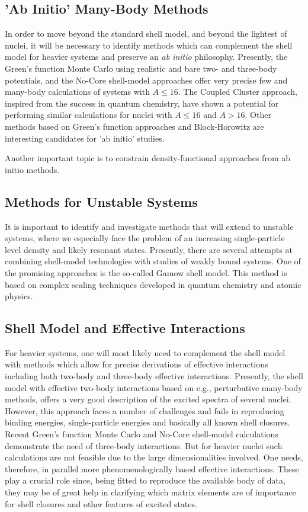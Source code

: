 \subsection{'Ab Initio' Many-Body Methods}

In order to move beyond the standard shell model, and beyond the
lightest of nuclei, it will be necessary to
identify methods which can complement the shell model for heavier 
systems and preserve an {\it ab initio} philosophy. Presently, 
the Green's function Monte Carlo using realistic
and bare two- and three-body potentials, 
and the No-Core shell-model 
approaches offer very precise few and many-body 
calculations of systems with 
$A\le 16$.  The Coupled Cluster approach, inspired 
from the success in quantum chemistry, have shown a 
potential for performing similar calculations
for nuclei with $A\le 16$ and $A> 16$. 
Other methods based on Green's function approaches and 
Block-Horowitz are interesting candidates for 'ab initio' studies.

Another important topic is to constrain density-functional approaches from ab initio
methods.


\subsection{Methods for Unstable Systems} 

It is important to identify and investigate 
methods that will extend to unstable 
systems, where we especially face the problem of an 
increasing single-particle 
level density and likely resonant states.
Presently, there are several attempts at  
combining shell-model 
technologies with  studies of weakly bound systems. 
One of the promising approaches is 
the so-called Gamow shell model. This method
is based on complex scaling techniques 
developed in quantum chemistry and atomic physics.


\subsection{Shell Model and Effective Interactions} 

For heavier systems, one will most likely need to 
complement the shell model with methods which allow 
for precise derivations of effective
interactions including both two-body and three-body effective interactions.
Presently, the  shell model with effective two-body interactions based on 
e.g., perturbative many-body methods,
offers a very good description of the 
excited spectra of several nuclei.  However, this approach faces 
a number of challenges and fails in reproducing 
binding energies, single-particle energies and basically  
all known shell closures. Recent Green's function Monte Carlo 
and No-Core shell-model 
calculations demonstrate the need of three-body 
interactions.  But for heavier nuclei
such calculations are not feasible due to the 
large dimensionalities involved.
One needs, therefore, in parallel more phenomenologically based 
effective interactions. These play a crucial role
since, being fitted to reproduce the available body of data, 
they may be of great help in clarifying
which matrix elements are of importance for shell 
closures and other features of 
excited states.   

